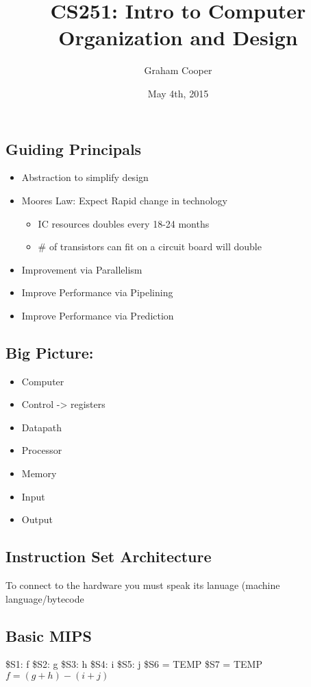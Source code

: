 \documentclass[12pt]{article}
\title{\vspace{-15ex}CS251: Intro to Computer Organization and Design\vspace{-1ex}}
\date{May 4th, 2015}
\author{Graham Cooper}
\begin{document}
	\maketitle
	
	\subsection*{Guiding Principals}
	\begin{itemize}
		\item Abstraction to simplify design
		\item Moores Law: Expect Rapid change in technology
		\begin{itemize}
			\item IC resources doubles every 18-24 months
			\item \# of transistors can fit on a circuit board will double
		\end{itemize}
		\item Improvement via Parallelism
		\item Improve Performance via Pipelining
		\item Improve Performance via Prediction
	\end{itemize}
	
	\subsection*{Big Picture:}
	\begin{itemize}
		\item Computer
		\item Control -> registers
		\item Datapath
		\item Processor
		\item Memory
		\item Input
		\item Output
	\end{itemize}{}
	
	\subsection*{Instruction Set Architecture}
	To connect to the hardware you must speak its lanuage (machine language/bytecode\\
	
	\subsection*{Basic MIPS}
	\$S1: f \$S2: g \$S3: h \$S4: i \$S5: j \$S6 = TEMP \$S7 = TEMP\\
	
	$f = (g + h) - (i + j)$
	
	
	
\end{document}

